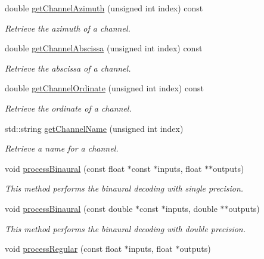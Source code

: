 \begin{DoxyCompactItemize}
double \hyperlink{class_hoa2_d_1_1_decoder_multi_a27e9a7dfb9e88e22470849f6f32c7270}{get\-Channel\-Azimuth} (unsigned int index) const 
\begin{DoxyCompactList}\small\item\em Retrieve the azimuth of a channel. \end{DoxyCompactList}\item 
double \hyperlink{class_hoa2_d_1_1_decoder_multi_a31085fe8704942e389e9e5cd00d195bd}{get\-Channel\-Abscissa} (unsigned int index) const 
\begin{DoxyCompactList}\small\item\em Retrieve the abscissa of a channel. \end{DoxyCompactList}\item 
double \hyperlink{class_hoa2_d_1_1_decoder_multi_a4a0032053910595155cf5299c883385b}{get\-Channel\-Ordinate} (unsigned int index) const 
\begin{DoxyCompactList}\small\item\em Retrieve the ordinate of a channel. \end{DoxyCompactList}\item 
std\-::string \hyperlink{class_hoa2_d_1_1_decoder_multi_af2208568e5aff57ade0ba5a00656db32}{get\-Channel\-Name} (unsigned int index)
\begin{DoxyCompactList}\small\item\em Retrieve a name for a channel. \end{DoxyCompactList}\item 
void \hyperlink{class_hoa2_d_1_1_decoder_multi_a215385080edb593cb2d8c0e7124d0c00}{process\-Binaural} (const float $\ast$const $\ast$inputs, float $\ast$$\ast$outputs)
\begin{DoxyCompactList}\small\item\em This method performs the binaural decoding with single precision. \end{DoxyCompactList}\item 
void \hyperlink{class_hoa2_d_1_1_decoder_multi_ac2aed267552cfa2535156742529bfa54}{process\-Binaural} (const double $\ast$const $\ast$inputs, double $\ast$$\ast$outputs)
\begin{DoxyCompactList}\small\item\em This method performs the binaural decoding with double precision. \end{DoxyCompactList}\item 
void \hyperlink{class_hoa2_d_1_1_decoder_multi_a7d4d1130db9e008e178a4210571d9f97}{process\-Regular} (const float $\ast$inputs, float $\ast$outputs)

\end{DoxyCompactItemize}
